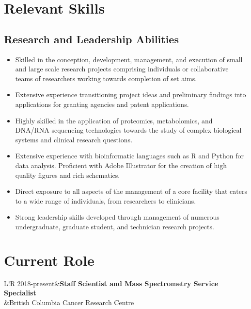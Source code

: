 \documentclass[11pt]{article}
\newcommand\VRule{\color{lightgray}\vrule width 0.5pt}
\begin{document}
\section*{Relevant Skills}
\begin{addmargin}[3em]{2em}%
	\subsection*{Research and Leadership Abilities}
	\begin{itemize}
		\item Skilled in the conception, development, management, and execution of small and large scale research projects comprising individuals or collaborative teams of researchers working towards completion of set aims.
		\item Extensive experience transitioning project ideas and preliminary findings into applications for granting agencies and patent applications.
		\item Highly skilled in the application of proteomics, metabolomics, and DNA/RNA sequencing technologies towards the study of
		complex biological systems and clinical research questions.
		\item Extensive experience with bioinformatic languages such as R and Python for data analysis. Proficient with Adobe Illustrator for the creation of high quality figures and rich schematics.
		\item Direct exposure to all aspects of the management of a core facility that caters to a wide range of individuals, from researchers
		to clinicians.
		\item Strong leadership skills developed through management of numerous undergraduate, graduate student, and technician research projects.
	\end{itemize}
\end{addmargin}

\section*{Current Role}
\begin{tabular}{L!{\VRule}R}
	2018-present&\textbf{Staff Scientist and Mass Spectrometry Service Specialist}\\
	&British Columbia Cancer Research Centre\\
\end{tabular}\\
\end{document}
